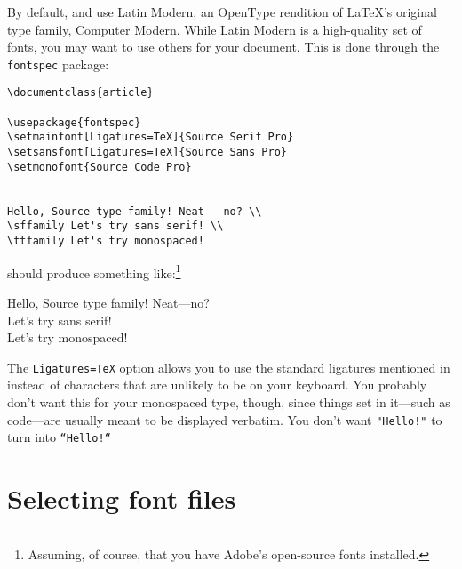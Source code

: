 By default, \LuaLaTeX{} and \XeLaTeX{} use Latin Modern,
an OpenType rendition of \LaTeX's original type family, Computer Modern.
While Latin Modern is a high-quality set of fonts,
you may want to use others for your document.
This is done through the \texttt{fontspec} package:
\begin{leftfigure}
\begin{lstlisting}
\documentclass{article}

\usepackage{fontspec}
\setmainfont[Ligatures=TeX]{Source Serif Pro}
\setsansfont[Ligatures=TeX]{Source Sans Pro}
\setmonofont{Source Code Pro}


Hello, Source type family! Neat---no? \\
\sffamily Let's try sans serif! \\
\ttfamily Let's try monospaced!

\end{lstlisting}
\end{leftfigure}
should produce something like:\footnote{Assuming, of course,
that you have Adobe's open-source fonts installed.\punckern{}}
\begin{leftfigure}
 Hello, Source type family! Neat---no? \\
 Let's try sans serif! \\
 Let's try monospaced!
\end{leftfigure}
The \verb|Ligatures=TeX| option allows you to use the standard ligatures
mentioned in  instead of characters that are
unlikely to be on your keyboard.
You probably don't want this for your monospaced type, though,
since things set in it---such as code---are usually meant to be displayed
verbatim. You don't want \verb|"Hello!"| to turn into
\verb|“Hello!“|

\section{Selecting font files}

